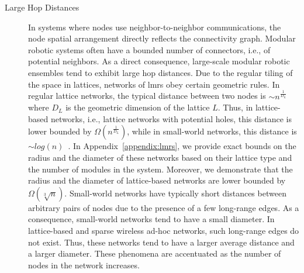 \begin{description}
	\item[Large Hop Distances] In systems where nodes use neighbor-to-neighbor communications, the node spatial arrangement directly reflects the connectivity graph. Modular robotic systems often have a bounded number of connectors, i.e., of potential neighbors. As a direct consequence, large-scale modular robotic ensembles tend to exhibit large hop distances. Due to the regular tiling of the space in lattices, networks of \gls{lmrs} obey certain geometric rules. In regular lattice networks, the typical distance between two nodes is $\sim {n}^{\frac{1}{D_L}}$~\cite{barthelemy2011spatial} where $D_L$ is the geometric dimension of the lattice $L$. Thus, in lattice-based networks, i.e., lattice networks with potential holes, this distance is lower bounded by $\Omega({n}^{\frac{1}{D_L}})$, while in small-world networks, this distance is $\sim log(n)$~\cite{barthelemy2011spatial}. In Appendix~\ref{appendix:lmrs}, we provide exact bounds on the radius and the diameter of these networks based on their lattice type and the number of modules in the system.  Moreover, we demonstrate that the radius and the diameter of lattice-based networks are lower bounded by $\Omega(\sqrt[3]{n})$. Small-world networks have typically short distances between arbitrary pairs of nodes due to the presence of a few long-range edges. As a consequence, small-world networks tend to have a small diameter. In lattice-based and sparse wireless ad-hoc networks, such long-range edges do not exist. Thus, these networks tend to have a larger average distance and a larger diameter. These phenomena are accentuated as the number of nodes in the network increases. 

\end{description}
